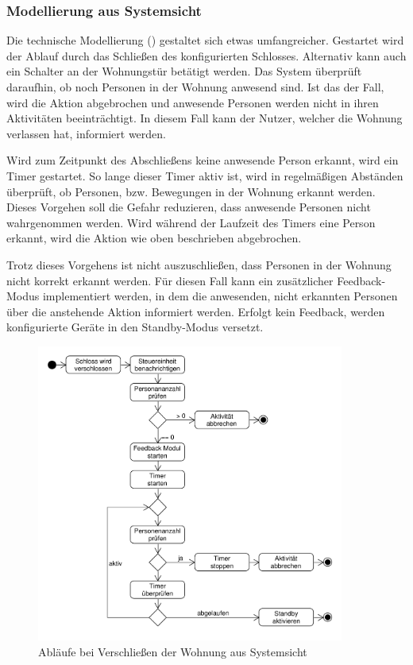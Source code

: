 \subsubsection{Modellierung aus Systemsicht}
Die technische Modellierung () gestaltet sich etwas umfangreicher. Gestartet wird der Ablauf durch das Schließen des konfigurierten Schlosses. Alternativ kann auch ein Schalter an der Wohnungstür betätigt werden. Das System überprüft daraufhin, ob noch Personen in der Wohnung anwesend sind. Ist das der Fall, wird die Aktion abgebrochen und anwesende Personen werden nicht in ihren Aktivitäten beeinträchtigt. In diesem Fall kann der Nutzer, welcher die Wohnung verlassen hat, informiert werden.

Wird zum Zeitpunkt des Abschließens keine anwesende Person erkannt, wird ein Timer gestartet. So lange dieser Timer aktiv ist, wird in regelmäßigen Abständen überprüft, ob Personen, bzw. Bewegungen in der Wohnung erkannt werden. Dieses Vorgehen soll die Gefahr reduzieren, dass anwesende Personen nicht wahrgenommen werden. Wird während der Laufzeit des Timers eine Person erkannt, wird die Aktion wie oben beschrieben abgebrochen.

Trotz dieses Vorgehens ist nicht auszuschließen, dass Personen in der Wohnung nicht korrekt erkannt werden. Für diesen Fall kann ein zusätzlicher Feedback-Modus implementiert werden, in dem die anwesenden, nicht erkannten Personen über die anstehende Aktion informiert werden. Erfolgt kein Feedback, werden konfigurierte Geräte in den Standby-Modus versetzt.

\newpage

\begin{figure}[h!]
	\centering
	\includegraphics[width=0.9\textwidth]{img/Szenarien/WohnungSchliessen.pdf}
	\caption{Abläufe bei Verschließen der Wohnung aus Systemsicht}
	\label{fig:szenarienStandby}
\end{figure}

